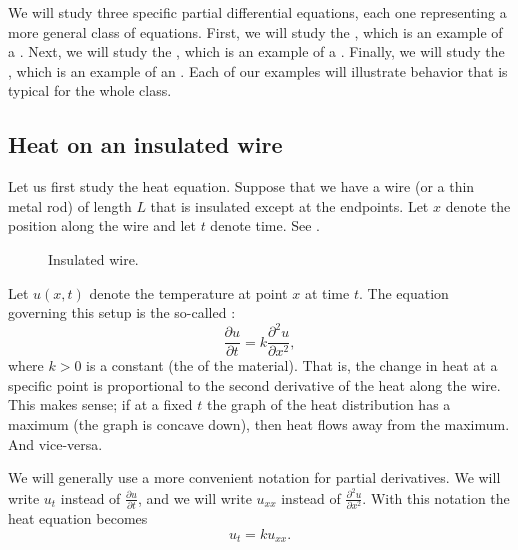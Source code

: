 \documentclass[12pt]{book}
\begin{document}
We will study three specific
partial differential equations, each one representing a
more general class of equations.  First, we will study the
\emph{}, which is an example of
a \emph{}.  Next, we will study the
\emph{}, which is an example of
a \emph{}.  Finally, we will study the
\emph{}, which is an example of
an \emph{}.  Each of our examples will illustrate
behavior that is typical for the whole class.

\subsection{Heat on an insulated wire}

Let us first study the heat equation.
Suppose that we have a wire (or a thin metal rod) of length $L$
that is insulated
except at the
endpoints.  Let $x$ denote the position along the wire and let $t$ denote
time.  See .

\begin{figure}[h!t]
\capstart
\begin{center}
\caption{Insulated wire.\label{heat:wirefig}}
\end{center}
\end{figure}

Let $u(x,t)$ denote the temperature at point $x$ at time $t$.
The equation governing this setup is the
so-called \emph{}:
\begin{equation*}
\boxed{~~
\frac{\partial u}{\partial t} =
k \frac{\partial^2 u}{\partial x^2} ,
~~}
\end{equation*}
where $k > 0$ is a constant (the \emph{} of the material).
That is, the change in heat at a specific point is proportional to the second
derivative of the heat along the wire.  This makes sense;
if at a fixed $t$
the graph of the heat distribution has a maximum (the graph is concave down),
then heat flows away from the maximum.  And vice-versa.

We will generally use a more convenient notation for partial derivatives.
We will write $u_t$ instead of $\frac{\partial u}{\partial t}$,
and we will write $u_{xx}$ instead of $\frac{\partial^2 u}{\partial x^2}$.
With this notation the heat equation becomes
\begin{equation*}
u_t = k u_{xx} .
\end{equation*}
\end{document}
